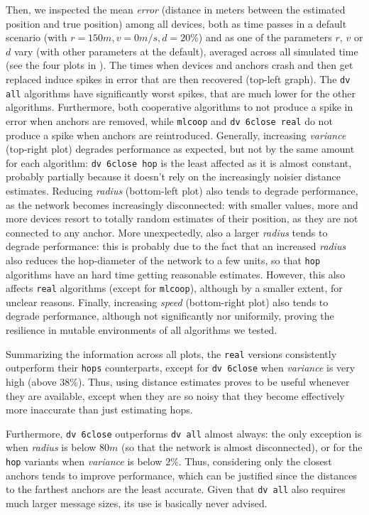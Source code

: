 \documentclass[runningheads]{llncs}
\begin{document}
Then, we inspected the mean \emph{error} (distance in meters between the estimated position and true position) among all devices, both as time passes in a default scenario (with $r = 150m, v = 0m/s, d=20\%$) and as one of the parameters $r$, $v$ or $d$ vary (with other parameters at the default), averaged across all simulated time (see the four plots in ).
The times when devices and anchors crash and then get replaced induce spikes in error that are then recovered (top-left graph). The \texttt{dv all} algorithms have significantly worst spikes, that are much lower for the other algorithms. Furthermore, both cooperative algorithms to not produce a spike in error when anchors are removed, while \texttt{mlcoop} and \texttt{dv 6close real} do not produce a spike when anchors are reintroduced.
Generally, increasing \emph{variance} (top-right plot) degrades performance as expected, but not by the same amount for each algorithm: \texttt{dv 6close hop} is the least affected as it is almost constant, probably partially because it doesn't rely on the increasingly noisier distance estimates. Reducing \emph{radius} (bottom-left plot) also tends to degrade performance, as the network becomes increasingly disconnected: with  smaller values, more and more devices resort to totally random estimates of their position, as they are not connected to any anchor. More unexpectedly, also a larger \emph{radius} tends to degrade performance: this is probably due to the fact that an increased \emph{radius} also reduces the hop-diameter of the network to a few units, so that \texttt{hop} algorithms have an hard time getting reasonable estimates. However, this also affects \texttt{real} algorithms (except for \texttt{mlcoop}), although by a smaller extent, for unclear reasons. Finally, increasing \emph{speed} (bottom-right plot) also tends to degrade performance, although not significantly nor uniformily, proving the resilience in mutable environments of all algorithms we tested.

Summarizing the information across all plots, the \texttt{real} versions consistently outperform their \texttt{hops} counterparts, except for \texttt{dv 6close} when \emph{variance} is very high (above $38\%$). Thus, using distance estimates proves to be useful whenever they are available, except when they are so noisy that they become effectively more inaccurate than just estimating hops.

Furthermore, \texttt{dv 6close} outperforms \texttt{dv all} almost always: the only exception is when \emph{radius} is below $80m$ (so that the network is almost disconnected), or for the \texttt{hop} variants when \emph{variance} is below $2\%$. Thus, considering only the closest anchors tends to improve performance, which can be justified since the distances to the farthest anchors are the least accurate. Given that \texttt{dv all} also requires much larger message sizes, its use is basically never advised.
\end{document}
